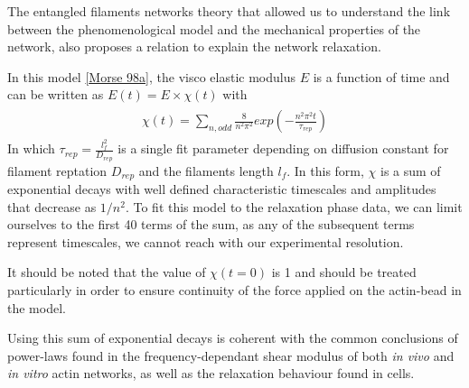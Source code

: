 \documentclass[A4paperpaper,11pt,english]{sphinxmanual}
\begin{document}
The entangled filaments networks theory that allowed us to understand the link between the phenomenological
model and the mechanical properties of the network, also proposes a relation to
explain the network relaxation.

In this model {\hyperref[parts/part3:morse1998a]{{[}Morse 98a{]}}}, the visco elastic modulus  \(E\) is a function of time
and can be written as \(E(t) = E\times \chi(t)\) with
\label{parts/part3:equation-chi}\begin{gather}
\begin{split}\chi(t)=\sum_{n, odd} \frac{8}{n^2 \pi^2}exp\left(- \frac{n^2\pi^2 t}{ \tau_{rep}} \right)\end{split}\label{parts/part3-chi}
\end{gather}
In which \(\tau_{rep} = \frac{l_f^2}{D_{rep}}\) is a single fit parameter
depending on diffusion constant for filament reptation \(D_{rep}\) and the
filaments length \(l_f\). In this form, \(\chi\) is a sum of
exponential decays with well defined characteristic timescales and amplitudes
that decrease as \(1/n^2\). To fit this model to the
relaxation phase data, we can limit ourselves to the first 40 terms of the sum, as
any of the subsequent terms represent timescales, we cannot reach with our
experimental resolution.

It should be noted that the value of \(\chi(t=0)\) is 1 and should be
treated particularly in order to ensure continuity of the force applied on the
actin-bead in the model.

Using this sum of exponential decays is coherent with the common conclusions of
power-laws found in the frequency-dependant shear modulus of both \emph{in vivo} and \emph{in vitro} actin
networks, as well as the relaxation behaviour found in cells.
\end{document}
